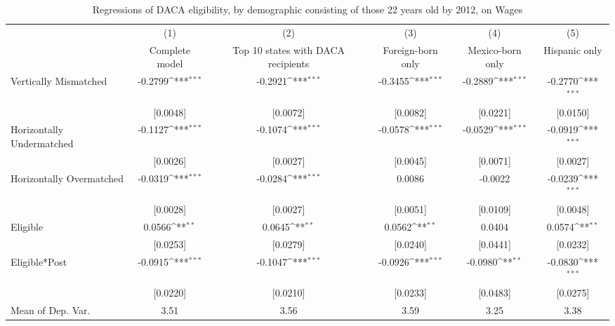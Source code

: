 \begin{table}[htbp]\centering
\def\sym#1{\ifmmode^{#1}\else\(^{#1}\)\fi}
\caption{Regressions of DACA eligibility, by demographic consisting of those 22 years old by 2012, on Wages}
\begin{tabular}{l*{5}{c}}
\toprule
                    &\multicolumn{1}{c}{(1)}         &\multicolumn{1}{c}{(2)}         &\multicolumn{1}{c}{(3)}         &\multicolumn{1}{c}{(4)}         &\multicolumn{1}{c}{(5)}         \\
                    &Complete model         &Top 10 states with DACA recipients         &Foreign-born only         &Mexico-born only         &Hispanic only         \\
\midrule
Vertically Mismatched&     -0.2799\sym{***}&     -0.2921\sym{***}&     -0.3455\sym{***}&     -0.2889\sym{***}&     -0.2770\sym{***}\\
                    &    [0.0048]         &    [0.0072]         &    [0.0082]         &    [0.0221]         &    [0.0150]         \\
\addlinespace
Horizontally Undermatched&     -0.1127\sym{***}&     -0.1074\sym{***}&     -0.0578\sym{***}&     -0.0529\sym{***}&     -0.0919\sym{***}\\
                    &    [0.0026]         &    [0.0027]         &    [0.0045]         &    [0.0071]         &    [0.0027]         \\
\addlinespace
Horizontally Overmatched&     -0.0319\sym{***}&     -0.0284\sym{***}&      0.0086         &     -0.0022         &     -0.0239\sym{***}\\
                    &    [0.0028]         &    [0.0027]         &    [0.0051]         &    [0.0109]         &    [0.0048]         \\
\addlinespace
Eligible            &      0.0566\sym{**} &      0.0645\sym{**} &      0.0562\sym{**} &      0.0404         &      0.0574\sym{**} \\
                    &    [0.0253]         &    [0.0279]         &    [0.0240]         &    [0.0441]         &    [0.0232]         \\
\addlinespace
Eligible*Post       &     -0.0915\sym{***}&     -0.1047\sym{***}&     -0.0926\sym{***}&     -0.0980\sym{**} &     -0.0830\sym{***}\\
                    &    [0.0220]         &    [0.0210]         &    [0.0233]         &    [0.0483]         &    [0.0275]         \\
\midrule
Mean of Dep. Var.   &        3.51         &        3.56         &        3.59         &        3.25         &        3.38         \\

\end{tabular}
\end{table}
